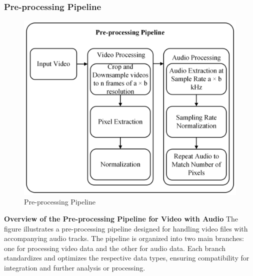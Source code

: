         \subsubsection{Pre-processing Pipeline}
        \begin{figure}[H]
            \centering
            \includegraphics[width=0.9\linewidth]{assets/Major Data Pre-Processing.png}
            \caption{Pre-processing Pipeline}
            \label{fig:pre-processing-pipeline}
        \end{figure}
        
        \textbf{Overview of the Pre-processing Pipeline for Video with Audio}
        The figure illustrates a pre-processing pipeline designed for handling video files with accompanying audio tracks. The pipeline is organized into two main branches: one for processing video data and the other for audio data. Each branch standardizes and optimizes the respective data types, ensuring compatibility for integration and further analysis or processing.
        
